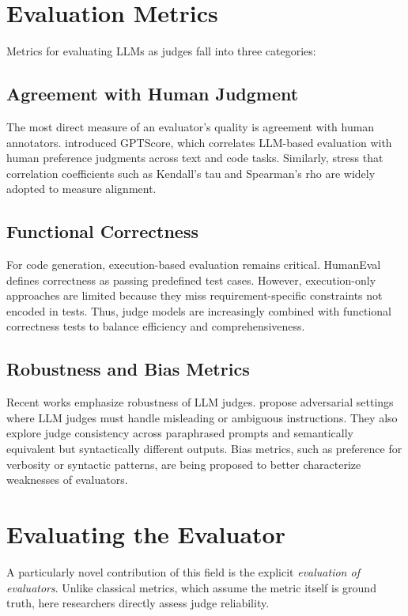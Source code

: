 \section{Evaluation Metrics}
Metrics for evaluating LLMs as judges fall into three categories:

\subsection{Agreement with Human Judgment}
The most direct measure of an evaluator’s quality is agreement with human annotators.\citet{fu2023gptscore} introduced GPTScore, which correlates LLM-based evaluation with human preference judgments across text and code tasks. Similarly, \citet{xu2023survey} stress that correlation coefficients such as Kendall’s tau and Spearman’s rho are widely adopted to measure alignment.

\subsection{Functional Correctness}
For code generation, execution-based evaluation remains critical. HumanEval \citep{chen2021evaluating} defines correctness as passing predefined test cases. However, execution-only approaches are limited because they miss requirement-specific constraints not encoded in tests. Thus, judge models are increasingly combined with functional correctness tests to balance efficiency and comprehensiveness.

\subsection{Robustness and Bias Metrics}
Recent works emphasize robustness of LLM judges.\citet{wang2023aligning} propose adversarial settings where LLM judges must handle misleading or ambiguous instructions. They also explore judge consistency across paraphrased prompts and semantically equivalent but syntactically different outputs. Bias metrics, such as preference for verbosity or syntactic patterns, are being proposed to better characterize weaknesses of evaluators.

\section{Evaluating the Evaluator}
A particularly novel contribution of this field is the explicit \textit{evaluation of evaluators}. Unlike classical metrics, which assume the metric itself is ground truth, here researchers directly assess judge reliability.

